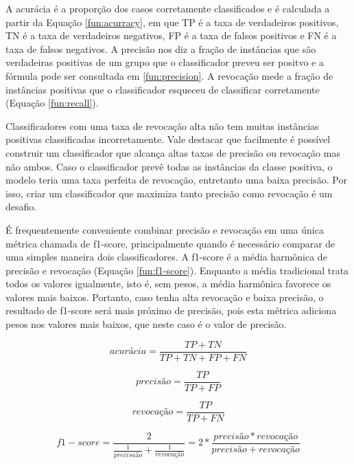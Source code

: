 A acurácia é a proporção dos casos corretamente classificados e é calculada a partir da Equação \ref{fun:acurracy}, em que TP é a taxa de verdadeiros positivos, TN é a taxa de verdadeiros negativos, FP é a taxa de falsos positivos e FN é a taxa de falsos negativos. A precisão nos diz a fração de instâncias que são verdadeiras positivas de um grupo que o classificador preveu ser positvo e a fórmula pode ser consultada em \ref{fun:precision}. A revocação mede a fração de instâncias positivas que o classificador esqueceu de classificar corretamente (Equação \ref{fun:recall}). 

Classificadores com uma taxa de revocação alta não tem muitas instâncias positivas classificadas incorretamente. Vale destacar que facilmente é possível construir um classificador que alcança altas taxas de precisão ou revocação mas não ambos. Caso o classificador prevê todas as instâncias da classe positiva, o modelo teria uma taxa perfeita de revocação, entretanto uma baixa precisão. Por isso, criar um classificador que maximiza tanto precisão como revocação é um desafio.

É frequentemente conveniente combinar precisão e revocação em uma única métrica chamada de f1-score, principalmente quando é necessário comparar de uma simples maneira dois classificadores. A f1-score é a média harmônica de precisão e revocação (Equação \ref{fun:f1-score}). Enquanto a média tradicional trata todos os valores igualmente, isto é, sem pesos, a média harmônica favorece os valores mais baixos. Portanto, caso tenha alta revocação e baixa precisão, o resultado de f1-score será mais próximo de precisão, pois esta métrica adiciona pesos nos valores mais baixos, que neste caso é o valor de precisão.  

\begin{equation}
\label{fun:acurracy}
acurácia = \frac{TP + TN}{TP + TN + FP + FN} 
\end{equation}


\begin{equation}
\label{fun:precision}
precisão = \frac{TP}{TP + FP} 
\end{equation}

\begin{equation}
\label{fun:recall}
revocação = \frac{TP}{TP + FN} 
\end{equation}

\begin{equation}
\label{fun:f1-score}
f1-score = \frac{2}{\frac{1}{precisaão} + \frac{1}{revocação}} = 2 * \frac{precisão * revocação}{precisão + revocação}
\end{equation}



